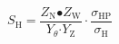 \[S_{\mathrm{H}}\mathrm{=}\frac{Z_{\mathrm{N}}\mathrm{\bullet }Z_{\mathrm{W}}}{Y_{\theta }\mathrm{\cdot }Y_{\mathrm{Z}}}\cdot \frac{{\sigma }_{\mathrm{HP}}}{{\sigma }_{\mathrm{H}}}\]